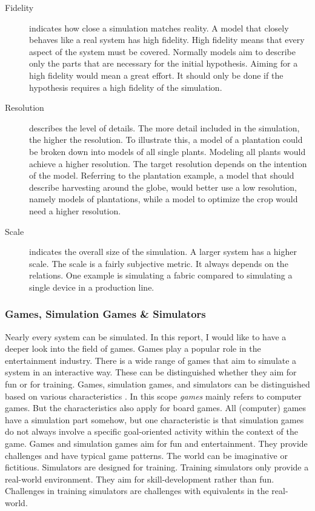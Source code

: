 \begin{description}

\item[Fidelity] indicates how close a simulation matches reality. A model that closely behaves like a real system has high fidelity. High fidelity means that every aspect of the system must be covered. Normally models aim to describe only the parts that are necessary for the initial hypothesis. Aiming for a high fidelity would mean a great effort. It should only be done if the hypothesis requires a high fidelity of the simulation.

\item[Resolution] describes the level of details. The more detail included in the simulation, the
higher the resolution. To illustrate this, a model of a plantation could be broken down into models of all single plants. Modeling all plants would achieve a higher resolution. The target resolution depends on the intention of the model. Referring to the plantation example, a model that should describe harvesting around the globe, would better use a low resolution, namely models of plantations, while a model to optimize the crop would need a higher resolution.

\item[Scale] indicates the overall size of the simulation. A larger system has a higher scale. The scale is a fairly subjective metric. It always depends on the relations. One example is simulating a fabric compared to simulating a single device in a production line.

\end{description}


\subsubsection{Games, Simulation Games \& Simulators}


Nearly every system can be simulated. In this report, I would like to have a deeper look into the field of games. Games play a popular role in the entertainment industry. There is a wide range of games that aim to simulate a system in an interactive way. These can be distinguished whether they aim for fun or for training.
Games, simulation games, and simulators can be distinguished based on various characteristics \cite{narayanasamy2006distinguishing}. In this scope \textit{games} mainly refers to computer games. But the characteristics also apply for board games.
All (computer) games have a simulation part somehow, but one characteristic is that simulation games do not always involve a specific goal-oriented activity within the context of the game. Games and simulation games aim for fun and entertainment. They provide challenges and have typical game patterns. The world can be imaginative or fictitious.
Simulators are designed for training. Training simulators only provide a real-world environment. They aim for skill-development rather than fun. Challenges in training simulators are challenges with equivalents in the real-world.


